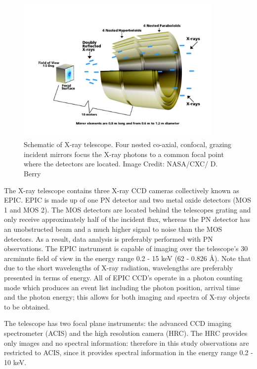 \begin{figure}
    \centering
    \includegraphics[width=0.9\textwidth]{Figures/3-Xray_age/chandra_scheme.pdf}
    \caption[Schematic of \Chandra X-ray telescope]{Schematic of \Chandra X-ray telescope. Four nested co-axial, confocal, grazing incident mirrors focus the X-ray photons to a common focal point where the detectors are located. Image Credit: NASA/CXC/ D. Berry}
    \label{fig:diagram_xray_telescope}
\end{figure}

The \XMM X-ray telescope \citep{Jansen_etal_2001} contains three X-ray CCD cameras collectively known as EPIC. EPIC is made up of one PN detector and two metal oxide detectors (MOS 1 and MOS 2). The MOS detectors are located behind the telescopes grating and only receive approximately half of the incident flux, whereas the PN detector has an unobstructed beam and a much higher signal to noise than the MOS detectors. As a result, data analysis is preferably performed with PN observations. The EPIC instrument is capable of imaging over the telescope's 30 arcminute field of view in the energy range 0.2 - 15 keV (62 - 0.826 \AA). Note that due to the short wavelengths of X-ray radiation, wavelengths are preferably presented in terms of energy. All of EPIC CCD's operate in a photon counting mode which produces an event list including the photon position, arrival time and the photon energy; this allows for both imaging and spectra of X-ray objects to be obtained.

The \Chandra telescope \citep{Weisskopf_etal_2000} has two focal plane instruments: the advanced CCD imaging spectrometer (ACIS) and the high resolution camera (HRC). The HRC provides only images and no spectral information: therefore in this study observations are restricted to ACIS, since it provides spectral information in the energy range 0.2 - 10 keV.

